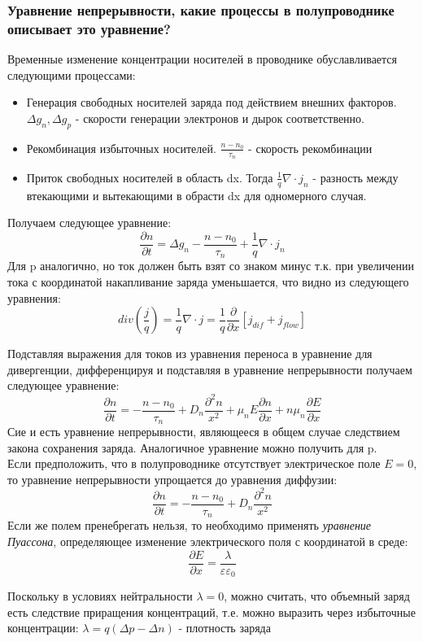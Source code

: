 \subsubsection{Уравнение непрерывности, какие процессы в полупроводнике описывает это уравнение?}
Временные изменение концентрации носителей в проводнике обуславливается следующими процессами:
\begin{itemize}
\item Генерация свободных носителей заряда под действием внешних факторов. $\Delta g_n , \Delta g_p$ - скорости генерации электронов и дырок соответственно.
\item Рекомбинация избыточных носителей. $\frac{n - n_0}{\tau_n}$ - скорость рекомбинации
\item Приток свободных носителей в область dx. Тогда $\frac{1}{q}\nabla \cdot j_{n}$ - разность между втекающими и вытекающими в обрасти dx для одномерного случая.
\end{itemize}

Получаем следующее уравнение:
\begin{equation}
\frac{\partial n}{ \partial t} = \Delta g_n - \frac{n - n_0}{\tau_n} + \frac{1}{q} \nabla \cdot j_{n}
\end{equation}
Для p аналогично, но ток должен быть взят со знаком минус т.к. при увеличении тока с координатой накапливание заряда уменьшается, что видно из следующего уравнения:
\begin{equation}
div(\frac{j}{q}) = \frac{1}{q} \nabla \cdot j = \frac{1}{q}\frac{\partial}{ \partial x} \left[ j_{dif} + j_{flow} \right]
\end{equation}

Подставляя выражения для токов из уравнения переноса в уравнение для дивергенции, дифференцируя и подставляя в уравнение непрерывности получаем следующее уравнение:
\begin{equation}
\frac{\partial n}{ \partial t} = -  \frac{n - n_0}{\tau_n}  + D_n \frac{\partial^2 n }{x^2} + \mu_n E \frac{\partial n}{\partial x} + n \mu_n \frac{\partial E}{\partial x}
\end{equation}
Сие и есть уравнение непрерывности, являющееся в общем случае следствием закона сохранения заряда. Аналогичное уравнение можно получить для p.\\

Если предположить, что в полупроводнике отсутствует электрическое поле $E=0$, то уравнение непрерывности упрощается до уравнения диффузии:
\begin{equation}
\frac{\partial n}{ \partial t} = -  \frac{n - n_0}{\tau_n}  + D_n \frac{\partial^2 n }{x^2}
\end{equation}
Если же полем пренебрегать нельзя, то необходимо применять\textit{ уравнение Пуассона}, определяющее изменение электрического поля с координатой в среде:
\begin{equation}
\frac{\partial E}{\partial x} = \frac{\lambda}{\varepsilon \varepsilon_0}
\end{equation}

Поскольку в условиях нейтральности $\lambda = 0$, можно считать, что объемный заряд есть следствие приращения концентраций, т.е. можно выразить через избыточные концентрации:  $\lambda = q (\Delta p - \Delta n)$ - плотность заряда



\pagebreak
